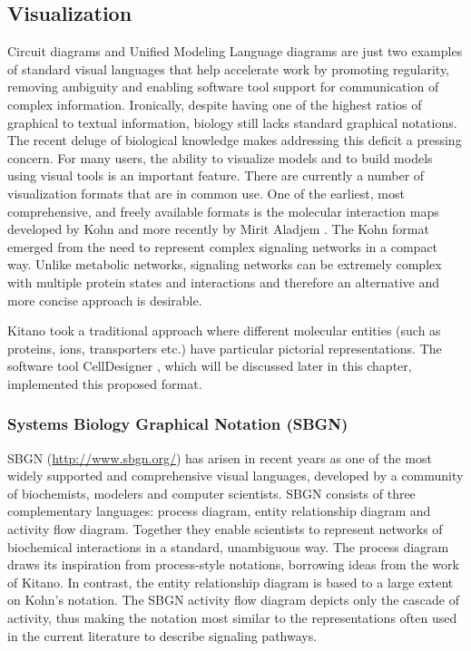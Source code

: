 \subsection{Visualization}

Circuit diagrams and Unified Modeling Language diagrams are just two
examples of standard visual languages that help accelerate work by
promoting regularity, removing ambiguity and enabling software tool
support for communication of complex information. Ironically, despite
having one of the highest ratios of graphical to textual information,
biology still lacks standard graphical notations. The recent deluge of
biological knowledge makes addressing this deficit a pressing concern.
For many users, the ability to visualize models and to build models
using visual tools is an important feature. There are currently a number
of visualization formats that are in common use. One of the earliest,
most comprehensive, and freely available formats is the molecular
interaction maps developed by Kohn \autocite{Kohn1999} and more recently
by Mirit Aladjem \autocite{Kohn2004}. The Kohn format emerged from the
need to represent complex signaling networks in a compact way. Unlike
metabolic networks, signaling networks can be extremely complex with
multiple protein states and interactions and therefore an alternative
and more concise approach is desirable.

Kitano \autocite{Kitano2003} took a traditional approach where different
molecular entities (such as proteins, ions, transporters etc.) have
particular pictorial representations. The software tool CellDesigner
\autocite{CellDesigner2003}, which will be discussed later in this
chapter, implemented this proposed format.

\subsubsection{Systems Biology Graphical Notation (SBGN)}

SBGN (\url{http://www.sbgn.org/}) \autocite{le2009systems} has arisen in
recent years as one of the most widely supported and comprehensive
visual languages, developed by a community of biochemists, modelers and
computer scientists. SBGN consists of three complementary languages:
process diagram, entity relationship diagram and activity flow diagram.
Together they enable scientists to represent networks of biochemical
interactions in a standard, unambiguous way. The process diagram draws
its inspiration from process-style notations, borrowing ideas from the
work of Kitano. In contrast, the entity relationship diagram is based to
a large extent on Kohn's notation. The SBGN activity flow diagram
depicts only the cascade of activity, thus making the notation most
similar to the representations often used in the current literature to
describe signaling pathways.

